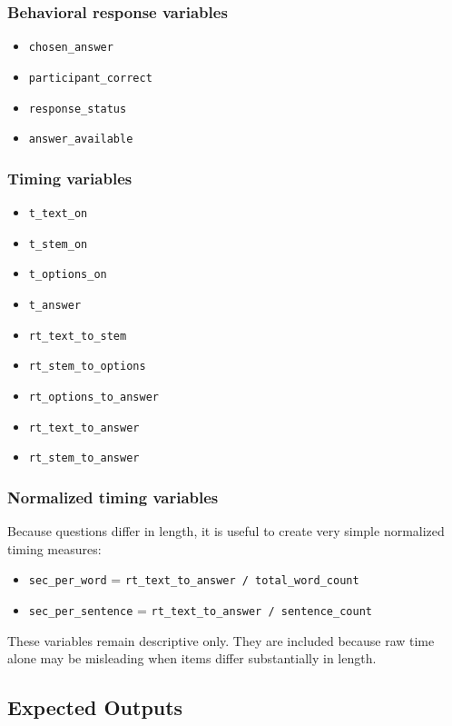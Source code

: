 \documentclass[11pt]{article}
\begin{document}
\subsubsection*{Behavioral response variables}
\begin{itemize}
    \item \texttt{chosen\_answer}
    \item \texttt{participant\_correct}
    \item \texttt{response\_status}
    \item \texttt{answer\_available}
\end{itemize}

\subsubsection*{Timing variables}
\begin{itemize}
    \item \texttt{t\_text\_on}
    \item \texttt{t\_stem\_on}
    \item \texttt{t\_options\_on}
    \item \texttt{t\_answer}
    \item \texttt{rt\_text\_to\_stem}
    \item \texttt{rt\_stem\_to\_options}
    \item \texttt{rt\_options\_to\_answer}
    \item \texttt{rt\_text\_to\_answer}
    \item \texttt{rt\_stem\_to\_answer}
\end{itemize}

\subsubsection*{Normalized timing variables}
Because questions differ in length, it is useful to create very simple normalized timing measures:
\begin{itemize}
    \item \texttt{sec\_per\_word} = \texttt{rt\_text\_to\_answer / total\_word\_count}
    \item \texttt{sec\_per\_sentence} = \texttt{rt\_text\_to\_answer / sentence\_count}
\end{itemize}

These variables remain descriptive only.
They are included because raw time alone may be misleading when items differ substantially in length.

\subsection{Expected Outputs}
\end{document}
